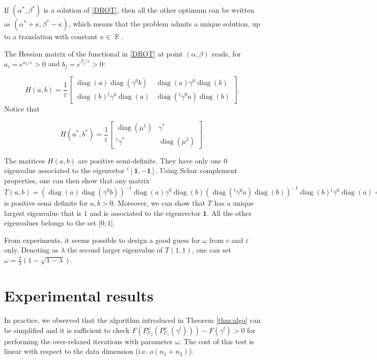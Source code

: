 \documentclass{article} %
\DeclareMathOperator{\IR}{\mathbb{R}}
\DeclareMathOperator{\Ccal}{\mathcal{C}}
\DeclareMathOperator{\diag}{diag}
\renewcommand{\epsilon}{\varepsilon}
\theoremstyle{plain}
\theoremstyle{definition}
\theoremstyle{remark}
\begin{document}
If $(\alpha^*,\beta^*)$ is a solution of \eqref{DROT}, then all the 
other optimum can be written as $(\alpha^*+\kappa,\beta^*-\kappa)$, which means that the problem admits a unique solution, up to a translation with constant $\kappa\in\IR$.


The Hessian matrix of the functional in \eqref{DROT} at point $(\alpha,\beta)$ reads, for $a_i=e^{\alpha_i/\epsilon}>0$ and $b_j=e^{\beta_j/\epsilon}>0$:


$$H(a,b)=\frac1\epsilon\begin{bmatrix}
\diag(a)\diag(\gamma^0 b)&\diag(a)\gamma^0 \diag(b)\\
\diag(b){^t\gamma^0} \diag(a)&\diag(^t\gamma^0a)\diag(b)
\end{bmatrix}.$$
Notice that 

$$H(a^*,b^*)=\frac1\epsilon\begin{bmatrix}
\diag(\mu^1)&\gamma^*\\
^t\gamma^*&\diag(\mu^2)
\end{bmatrix}.$$


The matrices $H(a,b)$  are positive semi-definite. They have only one $0$ eigenvalue associated to the eigenvetor $^t[\mathbf{1},-\mathbf{1}]$. 
Using Schur complement properties, one can then show that any matrix $T(a,b)=(\diag(a)\diag(\gamma^0 b))^{-1}\diag(a)\gamma^0\diag(b)(\diag(^t\gamma^0a)\diag(b))^{-1} \diag(b){^t\gamma^0}\diag(a)=(\diag(\gamma^0 b))^{-1}\gamma^0(\diag(^t\gamma^0a))^{-1} \diag(b){^t\gamma^0}\diag(a)$ is positive semi definite for $a,b>0$. Moreover, we can show that $T$ has a unique largest eigenvalue that is $1$ and is associated to the eigenvector $\mathbf{1}$. All the other eigenvalues belongs to the set $[0;1[$.


From experiments, it seems possible to design a good guess for $\omega$ from $c$ and $\epsilon$ only. 
    Denoting as $\lambda$ the second larger eigenvalue of $T(1,1)$, one can set 
    $\omega=\frac{2}{\lambda}(1-\sqrt{1-\lambda})$.
    
    
    
\section{Experimental results}


In practice, we observed that the algorithm introduced in Theorem \ref{thm:algo} can be simplified and it is sufficient to check $F(P^\omega_{\Ccal_2}(P^\omega_{\Ccal_1}(\gamma^l)))-F(\gamma^l)>0$ for performing the over-relaxed iterations with parameter $\omega$.
The cost of this test is linear with respect to the data dimension (i.e. $o(n_1+n_2)$).
\end{document}
